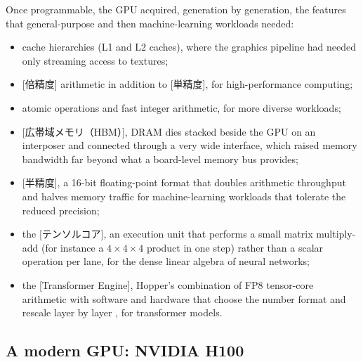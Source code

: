\documentclass[../main.tex]{subfiles}
\begin{document}
Once programmable, the GPU acquired, generation by generation, the
features that general-purpose and then machine-learning workloads
needed:
\begin{itemize}
  \item cache hierarchies (L1 and L2 caches), where the graphics pipeline
    had needed only streaming access to textures;
  \item {}[倍精度] arithmetic in addition to
    [単精度], for high-performance
    computing;
  \item atomic operations and fast integer arithmetic, for more diverse
    workloads;
  \item {}[広帯域メモリ（HBM）], DRAM dies
    stacked beside the GPU on an interposer and connected through a
    very wide interface, which raised memory bandwidth far beyond what
    a board-level memory bus provides;
  \item {}[半精度], a 16-bit floating-point
    format that doubles arithmetic throughput and halves memory traffic
    for machine-learning workloads that tolerate the reduced precision;
  \item the [テンソルコア], an execution unit that
    performs a small matrix multiply-add (for instance a
    $4 \times 4 \times 4$ product in one step) rather than a scalar
    operation per lane, for the dense linear algebra of neural
    networks;
  \item the [Transformer Engine], Hopper's
    combination of FP8 tensor-core arithmetic with software and hardware
    that choose the number format and rescale layer by layer
    \cite{nvidia2022hopper}, for transformer models.
\end{itemize}

\subsection{A modern GPU: NVIDIA H100}
\end{document}
